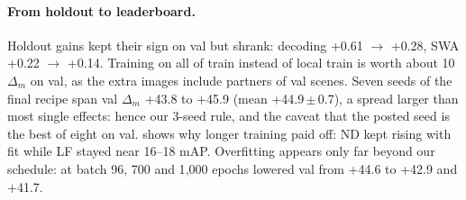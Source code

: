 \paragraph{From holdout to leaderboard.}
Holdout gains kept their sign on val but shrank: decoding +0.61 $\to$ +0.28, SWA +0.22 $\to$ +0.14.
Training on all of train instead of local train is worth about 10 $\Delta_m$ on val, as the extra images include
partners of val scenes.
Seven seeds of the final recipe span val $\Delta_m$ +43.8 to +45.9 (mean +44.9\,$\pm$\,0.7), a spread larger than most
single effects: hence our 3-seed rule, and the caveat that the posted seed is the best of eight on val.
 shows why longer training paid off: ND kept rising with fit while LF stayed near 16--18 mAP.
Overfitting appears only far beyond our schedule: at batch 96, 700 and 1{,}000 epochs lowered val from +44.6 to
+42.9 and +41.7.
